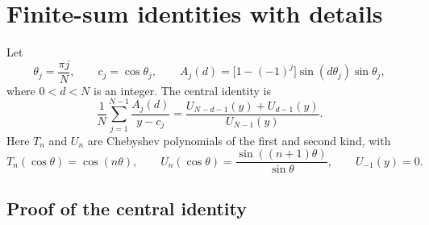 \documentclass[11pt]{article}
\begin{document}
\section{Finite-sum identities with details}
\label{sec:finite-identities}

Let
\begin{equation}
  \theta_j=\frac{\pi j}{N},
  \qquad
  c_j=\cos\theta_j,
  \qquad
  A_j(d)=\bigl[1-(-1)^j\bigr]\sin(d\theta_j)\sin\theta_j,
\end{equation}
where $0<d<N$ is an integer.  The central identity is
\begin{equation}
  \boxed{
  \frac1N\sum_{j=1}^{N-1}\frac{A_j(d)}{y-c_j}
  =\frac{U_{N-d-1}(y)+U_{d-1}(y)}{U_{N-1}(y)}.}
  \label{eq:central-identity}
\end{equation}
Here $T_n$ and $U_n$ are Chebyshev polynomials of the first and second kind, with
\begin{equation}
  T_n(\cos\theta)=\cos(n\theta),
  \qquad
  U_n(\cos\theta)=\frac{\sin((n+1)\theta)}{\sin\theta},
  \qquad
  U_{-1}(y)=0.
\end{equation}

\subsection{Proof of the central identity}
\end{document}
